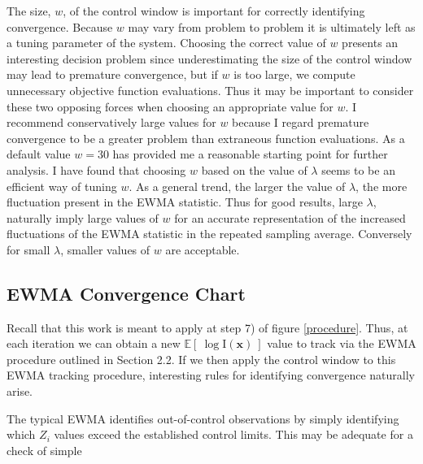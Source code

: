 \documentclass[12pt]{article}
\newcommand{\E}[1]{
        \mathbb{E}\left[~#1~\right]
}
\def \ix {
	\text{I}(\bm{x})
}
\begin{document}
	The size, $w$, of the control window is important for correctly identifying convergence.
	Because $w$ may vary from problem to problem it is ultimately left as a tuning parameter of the system.
	Choosing the correct value of $w$ presents an interesting decision problem since underestimating the size of the control window may lead to premature convergence, but if $w$ is too large, we compute unnecessary objective function evaluations.
	Thus it may be important to consider these two opposing forces when choosing an appropriate value for $w$.
	I recommend conservatively large values for $w$ because I regard premature convergence to be a greater problem than extraneous function evaluations.
	As a default value $w=30$ has provided me a reasonable starting point for further analysis.
	I have found that choosing $w$ based on the value of $\lambda$ seems to be an efficient way of tuning $w$.
	As a general trend, the larger the value of $\lambda$, the more fluctuation present in the EWMA statistic.
	Thus for good results, large $\lambda$, naturally imply large values of $w$ for an accurate representation of the increased fluctuations of the EWMA statistic in the repeated sampling average.
	Conversely for small $\lambda$, smaller values of $w$ are acceptable.
	

	\subsection{EWMA Convergence Chart}
	
	Recall that this work is meant to apply at step 7) of figure \ref{procedure}.
	Thus, at each iteration we can obtain a new $\E{\log\ix}$ value to track via the EWMA procedure outlined in Section 2.2.
	If we then apply the control window to this EWMA tracking procedure, interesting rules for identifying convergence naturally arise. 
	

	The typical EWMA identifies out-of-control observations  by simply identifying which $Z_i$ values exceed the established control limits. This may be adequate for a check of simple
\end{document}
